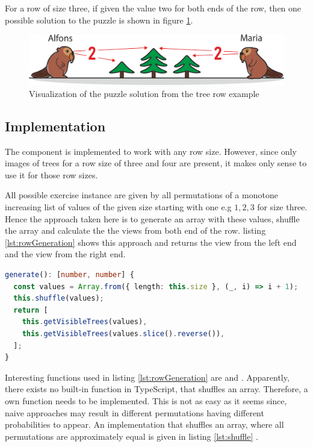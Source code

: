 \begin{example}
    For a row of size three, if given the value two for both ends of the row, then one possible solution to the puzzle is shown in figure \ref{fig:tree_row_example}.
\end{example}

\begin{figure} 
    \centering
    \includegraphics[width=0.8 \columnwidth]{figures/tree_row_example.png}
    \caption{Visualization of the puzzle solution from the tree row example} 
    \label{fig:tree_row_example} 
\end{figure}

\subsection{Implementation}

The  component is implemented to work with any row size. However, since only images of trees for a row size of three and four are present, it makes only sense to use it for those row sizes.

All possible exercise instance are given by all permutations of a monotone increasing list of values of the given size starting with one e.g $1, 2, 3$ for size three. Hence the approach taken here is to generate an array with these values, shuffle the array and calculate the the views from both end of the row. listing \ref{lst:rowGeneration} shows this approach and returns the view from the left end and the view from the right end.

\begin{lstlisting}[language=TypeScript,caption={Algorithm to generate a row of trees exercise instance of \code{this.size}},label={lst:rowGeneration}]
generate(): [number, number] {
  const values = Array.from({ length: this.size }, (_, i) => i + 1);
  this.shuffle(values);
  return [
    this.getVisibleTrees(values),
    this.getVisibleTrees(values.slice().reverse()),
  ];
}
\end{lstlisting}

Interesting functions used in listing \ref{lst:rowGeneration} are  and . Apparently, there exists no built-in function in TypeScript, that shuffles an array. Therefore, a own function needs to be implemented. This is not as easy as it seems since, naive approaches may result in different permutations having different probabilities to appear. An implementation that shuffles an array, where all permutations are approximately equal is given in listing \ref{lst:shuffle} \cite{JavaScriptShuffle}.

